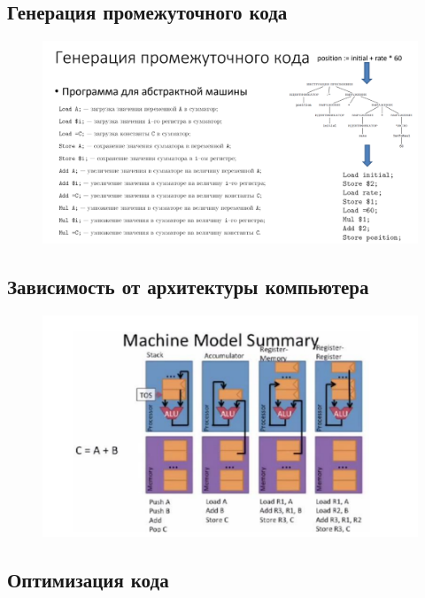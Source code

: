 \documentclass{article}
\begin{document}
\subsection{Генерация промежуточного кода}

\begin{figure}[H]
    \centering
    \includegraphics[width=1\linewidth]{Снимок экрана 2025-02-13 092347.png}
\end{figure}

\subsection{Зависимость от архитектуры компьютера}
\begin{figure}[H]
    \centering
    \includegraphics[width=1\linewidth]{Снимок экрана 2025-02-13 092401.png}
\end{figure}

\subsection{Оптимизация кода}
\end{document}
